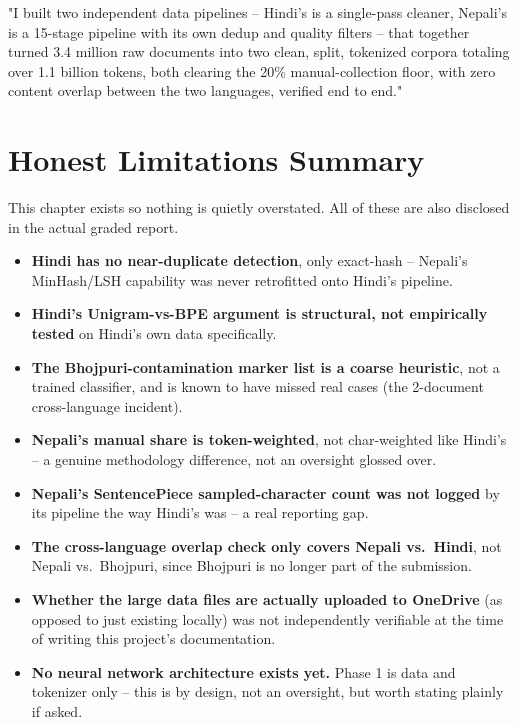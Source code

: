 \documentclass[11pt]{report}
\begin{document}
\begin{tcolorbox}[colback=titlenavy!5,colframe=titlenavy,fonttitle=\bfseries,
coltitle=white,colbacktitle=titlenavy,title={Recite this}]
"I built two independent data pipelines -- Hindi's is a single-pass
cleaner, Nepali's is a 15-stage pipeline with its own dedup and quality
filters -- that together turned 3.4 million raw documents into two
clean, split, tokenized corpora totaling over 1.1 billion tokens, both
clearing the 20\% manual-collection floor, with zero content overlap
between the two languages, verified end to end."
\end{tcolorbox}

\chapter{Honest Limitations Summary}
\label{sec:limitations-summary}

This chapter exists so nothing is quietly overstated. All of these are
also disclosed in the actual graded report.

\begin{itemize}[leftmargin=*]
\item \textbf{Hindi has no near-duplicate detection}, only exact-hash --
Nepali's MinHash/LSH capability was never retrofitted onto Hindi's
pipeline.
\item \textbf{Hindi's Unigram-vs-BPE argument is structural, not
empirically tested} on Hindi's own data specifically.
\item \textbf{The Bhojpuri-contamination marker list is a coarse
heuristic}, not a trained classifier, and is known to have missed real
cases (the 2-document cross-language incident).
\item \textbf{Nepali's manual share is token-weighted}, not
char-weighted like Hindi's -- a genuine methodology difference, not an
oversight glossed over.
\item \textbf{Nepali's SentencePiece sampled-character count was not
logged} by its pipeline the way Hindi's was -- a real reporting gap.
\item \textbf{The cross-language overlap check only covers Nepali vs.\
Hindi}, not Nepali vs.\ Bhojpuri, since Bhojpuri is no longer part of the
submission.
\item \textbf{Whether the large data files are actually uploaded to
OneDrive} (as opposed to just existing locally) was not independently
verifiable at the time of writing this project's documentation.
\item \textbf{No neural network architecture exists yet.} Phase 1 is data
and tokenizer only -- this is by design, not an oversight, but worth
stating plainly if asked.
\end{itemize}
\end{document}
